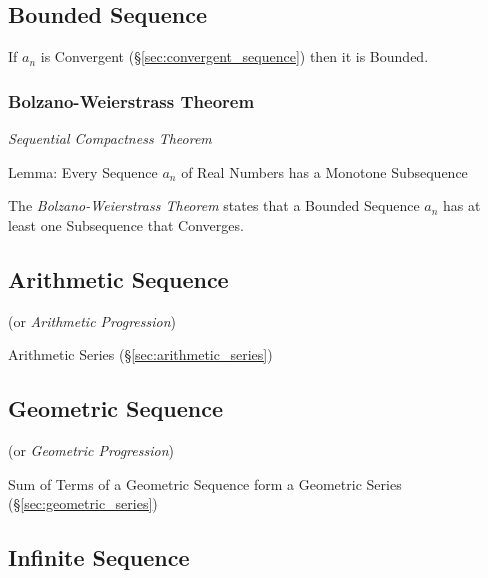 \subsection{Bounded Sequence}\label{sec:bounded_sequence}

If $a_n$ is Convergent (\S\ref{sec:convergent_sequence}) then it is
Bounded.



\subsubsection{Bolzano-Weierstrass Theorem}
\label{sec:bolzano_weierstrass}

\emph{Sequential Compactness Theorem}

Lemma: Every Sequence $a_n$ of Real Numbers has a Monotone
Subsequence

The \emph{Bolzano-Weierstrass Theorem} states that a Bounded Sequence
$a_n$ has at least one Subsequence that Converges.



\subsection{Arithmetic Sequence}\label{sec:arithmetic_sequence}

(or \emph{Arithmetic Progression})

Arithmetic Series (\S\ref{sec:arithmetic_series})



\subsection{Geometric Sequence}\label{sec:geometric_sequence}

(or \emph{Geometric Progression})

Sum of Terms of a Geometric Sequence form a Geometric Series
(\S\ref{sec:geometric_series})



\subsection{Infinite Sequence}\label{sec:infinite_sequence}

